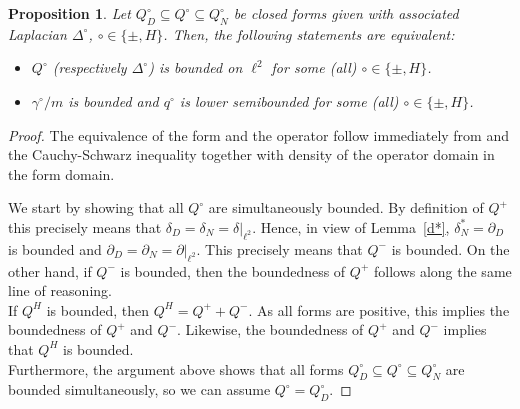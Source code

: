 \documentclass[10pt]{amsart}
\newtheorem{proposition}[theorem]{Proposition}
\theoremstyle{definition}
\renewcommand{\bullet}{{\circ}}
\begin{document}
\begin{proposition}\label{bound} Let $Q^{\bullet}_{D}\subseteq Q^{\bullet}\subseteq Q^{\bullet}_{N}$ be closed forms given with associated Laplacian $\Delta^{\bullet}$, $\bullet\in\{\pm,H\}$. 
    Then, the following statements are equivalent:
    \begin{itemize}
        \item[(i)] $Q^\bullet$ (respectively $\Delta^\bullet$) is bounded on $\ell^2$ for some (all) $\bullet\in\{\pm,H\}$.
        \item[(ii)]  $\gamma^\bullet\slash m$ is bounded and $q^\bullet$ is lower semibounded for some (all) $\bullet\in\lbrace \pm,H\rbrace$.
    \end{itemize}
\end{proposition}
\begin{proof}
	The equivalence of the form and the operator follow immediately from \cite[Theorem 5.35.]{W} and the Cauchy-Schwarz inequality together with density of the operator domain in the form domain.
	
    
    We start by showing that all $Q^{\bullet}$ are simultaneously bounded. By definition of $Q^+$ this precisely means that $\delta_{D}=\delta_{N}=\delta\vert_{\ell^{2}}$. Hence, in view of Lemma~\ref{d*}, $\delta_{N}^{*}=\partial_{D}$ is bounded and $\partial_{D}=\partial_{N}=\partial\vert_{\ell^{2}}$.
    This precisely means that $Q^-$ is bounded. On the other hand, if $Q^-$ is bounded, then the boundedness of $Q^+$ follows along  the same line of reasoning.\\
    If $Q^H$ is bounded, then $Q^H = Q^++Q^-.$ As all forms are positive, this implies the boundedness of $Q^+$ and $Q^-.$ Likewise, the boundedness of $Q^+$ and $Q^-$ implies that $Q^H$ is bounded.\\
    Furthermore,  the argument above shows that all forms $Q^{\bullet}_{D}\subseteq Q^{\bullet}\subseteq Q^{\bullet}_{N}$ are bounded simultaneously, so we can assume $Q^{\bullet}=Q^{\bullet}_{D}$.
    

\end{proof}
\end{document}
